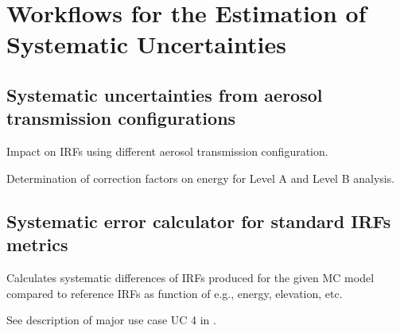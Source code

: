 \section{Workflows for the Estimation of Systematic Uncertainties}

\subsection{Systematic uncertainties from aerosol transmission configurations}

Impact on IRFs using different aerosol transmission configuration.

Determination of correction factors on energy for Level A and Level B analysis.

\subsection{Systematic error calculator for standard IRFs metrics}
\label{systematics:IRFmetric}

Calculates systematic differences of IRFs produced for the given MC model compared to reference IRFs as function of e.g., energy, elevation, etc.

See description of major use case UC 4 in \cite{CTAConcept}.